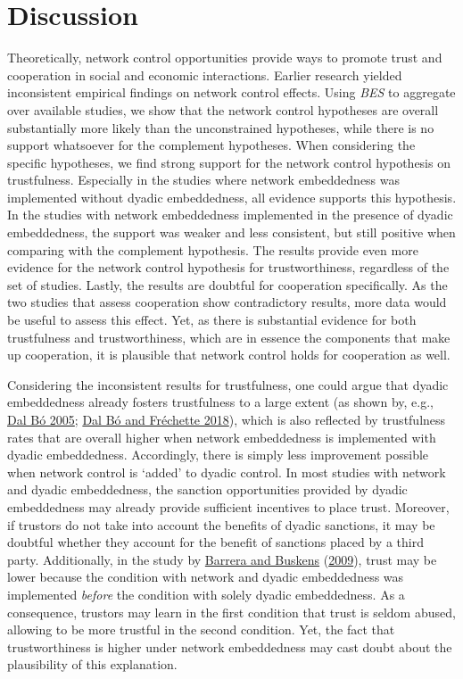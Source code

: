 \documentclass[
  11pt,
]{article}
\begin{document}
\hypertarget{discussion}{%
\section{Discussion}\label{discussion}}

Theoretically, network control opportunities provide ways to promote trust and cooperation in social and economic interactions.
Earlier research yielded inconsistent empirical findings on network control effects.
Using \emph{BES} to aggregate over available studies, we show that the network control hypotheses are overall substantially more likely than the unconstrained hypotheses, while there is no support whatsoever for the complement hypotheses.
When considering the specific hypotheses, we find strong support for the network control hypothesis on trustfulness.
Especially in the studies where network embeddedness was implemented without dyadic embeddedness, all evidence supports this hypothesis.
In the studies with network embeddedness implemented in the presence of dyadic embeddedness, the support was weaker and less consistent, but still positive when comparing with the complement hypothesis.
The results provide even more evidence for the network control hypothesis for trustworthiness, regardless of the set of studies.
Lastly, the results are doubtful for cooperation specifically.
As the two studies that assess cooperation show contradictory results, more data would be useful to assess this effect.
Yet, as there is substantial evidence for both trustfulness and trustworthiness, which are in essence the components that make up cooperation, it is plausible that network control holds for cooperation as well.

Considering the inconsistent results for trustfulness, one could argue that dyadic embeddedness already fosters trustfulness to a large extent (as shown by, e.g., \protect\hyperlink{ref-dal_buxf3_cooperation_2005}{Dal Bó 2005}; \protect\hyperlink{ref-dal_buxf3_fruxe9chette_determinants_2018}{Dal Bó and Fréchette 2018}), which is also reflected by trustfulness rates that are overall higher when network embeddedness is implemented with dyadic embeddedness.
Accordingly, there is simply less improvement possible when network control is `added' to dyadic control.
In most studies with network and dyadic embeddedness, the sanction opportunities provided by dyadic embeddedness may already provide sufficient incentives to place trust.
Moreover, if trustors do not take into account the benefits of dyadic sanctions, it may be doubtful whether they account for the benefit of sanctions placed by a third party.
Additionally, in the study by \protect\hyperlink{ref-barrera_buskens_third_2009}{Barrera and Buskens} (\protect\hyperlink{ref-barrera_buskens_third_2009}{2009}), trust may be lower because the condition with network and dyadic embeddedness was implemented \emph{before} the condition with solely dyadic embeddedness.
As a consequence, trustors may learn in the first condition that trust is seldom abused, allowing to be more trustful in the second condition.
Yet, the fact that trustworthiness is higher under network embeddedness may cast doubt about the plausibility of this explanation.
\end{document}
